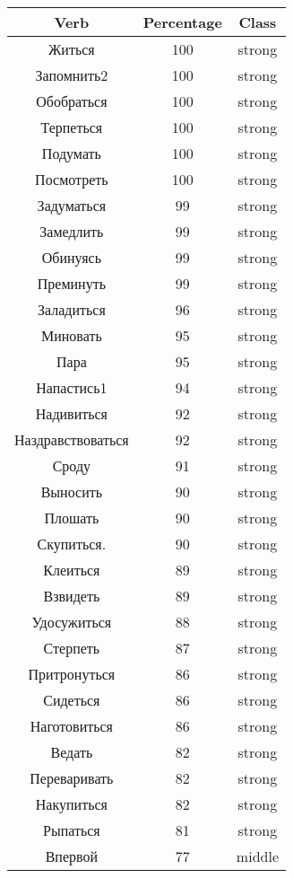 \documentclass[a4paper,12pt]{article}
\begin{document}
	\begin{longtable}{|c|c|c|} 
		\hline
		\textbf{Verb} & \textbf{Percentage} & \textbf{Class}\\ \hline
		Житься & 100 & strong \\ \hline
		Запомнить2 & 100 & strong \\ \hline
		Обобраться & 100 & strong \\ \hline
		Терпеться & 100 & strong \\ \hline
		Подумать & 100 & strong \\ \hline
		Посмотреть & 100 & strong \\ \hline
		Задуматься & 99 & strong \\ \hline
		Замедлить & 99 & strong \\ \hline
		Обинуясь & 99 & strong \\ \hline
		Преминуть & 99 & strong \\ \hline
		Заладиться & 96 & strong \\ \hline
		Миновать & 95 & strong \\ \hline
		Пара & 95 & strong \\ \hline
		Напастись1 & 94 & strong \\ \hline
		Надивиться & 92 & strong \\ \hline
		Наздравствоваться & 92 & strong \\ \hline
		Сроду & 91 & strong \\ \hline
		Выносить & 90 & strong \\ \hline
		Плошать & 90 & strong \\ \hline
		Скупиться. & 90 & strong \\ \hline
		Клеиться & 89 & strong \\ \hline
		Взвидеть & 89 & strong \\ \hline
		Удосужиться & 88 & strong \\ \hline
		Стерпеть & 87 & strong \\ \hline
		Притронуться & 86 & strong \\ \hline
		Сидеться & 86 & strong \\ \hline
		Наготовиться & 86 & strong \\ \hline
		Ведать & 82 & strong \\ \hline
		Переваривать & 82 & strong \\ \hline
		Накупиться & 82 & strong \\ \hline
		Рыпаться & 81 & strong \\ \hline
		Впервой & 77 & middle \\ \hline

\end{longtable}
\end{document}
